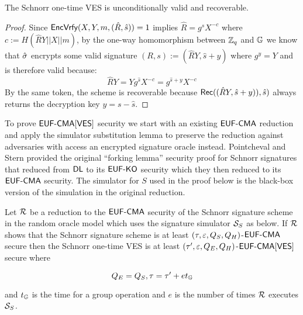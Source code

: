 \begin{lemma}
The Schnorr one-time VES is unconditionally valid and recoverable.
\end{lemma}

\begin{proof}
 Since $\textsf{EncVrfy}(X,Y,m,(\hat{R},\hat{s})) = 1$ implies $ \hat{R} = g^{\hat{s}}X^{-c}$ where $c := H(\hat{R}Y || X || m)$, by the one-way homomorphism between $\mathbb{Z}_q$ and $\mathbb{G}$ we know that $\hat{\sigma}$ encrypts some valid signature $(R,s) := (\hat{R}Y, \hat{s} + y)$ where $g^y = Y$ and is therefore valid because:
\[ \hat{R}Y = Yg^{\hat{s}}X^{-c} = g^{\hat{s} + y}X^{-c} \]
By the same token, the scheme is recoverable because $\textsf{Rec}((\hat{R}Y, \hat{s} + y)), \hat{s})$ always returns the decryption key $y = s - \hat{s}$.
\end{proof}

To prove $\textsf{EUF-CMA}[\textsf{VES}]$ security we start with an existing $\textsf{EUF-CMA}$ reduction and apply the simulator substitution lemma to preserve the reduction against adversaries with access an encrypted signature oracle instead.
Pointcheval and Stern\cite{pointcheval2000security} provided the original ``forking lemma'' \EUFCMA security proof for Schnorr signatures that reduced from $\textsf{DL}$ to its $\textsf{EUF-KO}$ security which they then reduced to its $\textsf{EUF-CMA}$ security.
The simulator for $S$ used in the proof below is the black-box version of the simulation in the original reduction.

\begin{theorem}

  Let $\mathcal{R}$ be a reduction to the $\textsf{EUF-CMA}$ security of the Schnorr signature scheme in the random oracle model which uses the signature simulator $\mathcal{S}_S$ as below.
  If $\mathcal{R}$ shows that the Schnorr signature scheme is at least $(\tau,\varepsilon,Q_S,Q_H)$-$\textsf{EUF-CMA}$ secure then the Schnorr one-time VES is at least $(\tau',\varepsilon,Q_E,Q_H)$-$\textsf{EUF-CMA}[\textsf{VES}]$ secure where

  \[ Q_E = Q_S, \tau = \tau' +  et_{\mathbb{G}} \]

  \hfill \break and $t_{\mathbb{G}}$ is the time for a group operation and $e$ is the number of times $\mathcal{R}$ executes $\mathcal{S}_S$.
\end{theorem}


